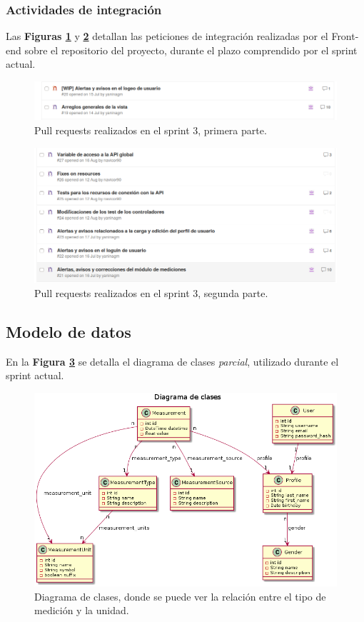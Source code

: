 \subsubsection{Actividades de integración}

Las \textbf{Figuras \ref{pull_request_sprint_3}} y \textbf{\ref{3-PR_back}} detallan las peticiones de integración realizadas por el Front-end sobre el repositorio del proyecto, durante el plazo comprendido por el sprint actual.

\begin{figure}[h]
  \centering
  \includegraphics[width=.8\textwidth]{img/3-PR_1_front}
  \caption{Pull requests realizados en el sprint 3, primera parte.}
  \label{pull_request_sprint_3}
\end{figure}
\begin{figure}[h]
  \centering
  \includegraphics[width=.8\textwidth]{img/3-PR_2_front}
  \caption{Pull requests realizados en el sprint 3, segunda parte.}
  \label{3-PR_back}
\end{figure}

\subsection{Modelo de datos}
\label{3-clases_involucradas}

En la \textbf{Figura \ref{relacion_tipo}} se detalla el diagrama de clases \textit{parcial}, utilizado durante el sprint actual.

\begin{figure}[h]
	\centering
	\includegraphics[width=.8\textwidth]{img/3-diagramaClases_relacionTipos}
	\caption{Diagrama de clases, donde se puede ver la relación entre el tipo de medición y la unidad.}
	\label{relacion_tipo}
\end{figure}



